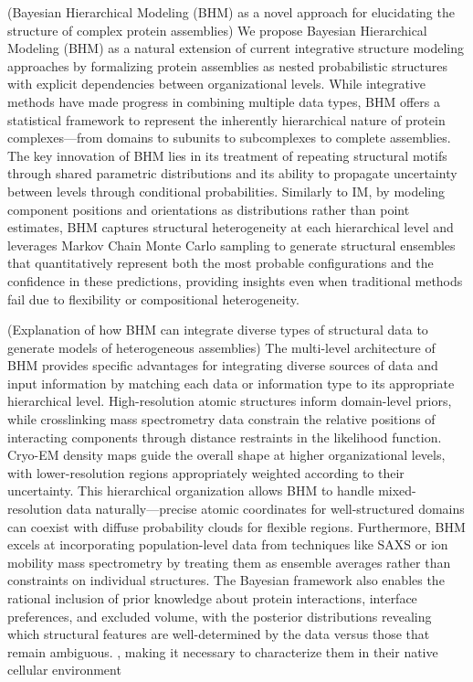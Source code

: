 \documentclass[journal=jcim,manuscript=article]{achemso}
\begin{document}
(Bayesian Hierarchical Modeling (BHM) as a novel approach for elucidating the structure of complex protein assemblies) We propose Bayesian Hierarchical Modeling (BHM) as a natural extension of current integrative structure modeling approaches by formalizing protein assemblies as nested probabilistic structures with explicit dependencies between organizational levels. While integrative methods have made progress in combining multiple data types, BHM offers a statistical framework to represent the inherently hierarchical nature of protein complexes—from domains to subunits to subcomplexes to complete assemblies. The key innovation of BHM lies in its treatment of repeating structural motifs through shared parametric distributions and its ability to propagate uncertainty between levels through conditional probabilities. Similarly to IM, by modeling component positions and orientations as distributions rather than point estimates, BHM captures structural heterogeneity at each hierarchical level and leverages Markov Chain Monte Carlo sampling to generate structural ensembles that quantitatively represent both the most probable configurations and the confidence in these predictions, providing insights even when traditional methods fail due to flexibility or compositional heterogeneity.

(Explanation of how BHM can integrate diverse types of structural data to generate models of heterogeneous assemblies) The multi-level architecture of BHM provides specific advantages for integrating diverse sources of data and input information by matching each data or information type to its appropriate hierarchical level. High-resolution atomic structures inform domain-level priors, while crosslinking mass spectrometry data constrain the relative positions of interacting components through distance restraints in the likelihood function. Cryo-EM density maps guide the overall shape at higher organizational levels, with lower-resolution regions appropriately weighted according to their uncertainty. This hierarchical organization allows BHM to handle mixed-resolution data naturally—precise atomic coordinates for well-structured domains can coexist with diffuse probability clouds for flexible regions. Furthermore, BHM excels at incorporating population-level data from techniques like SAXS or ion mobility mass spectrometry by treating them as ensemble averages rather than constraints on individual structures. The Bayesian framework also enables the rational inclusion of prior knowledge about protein interactions, interface preferences, and excluded volume, with the posterior distributions revealing which structural features are well-determined by the data versus those that remain ambiguous. 
,  making it necessary to characterize them in their native cellular environment
\end{document}

